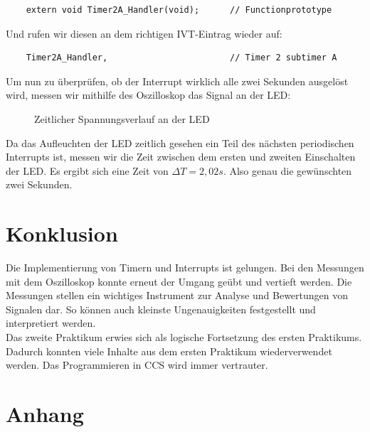 \documentclass{article}
\begin{document}
\begin{verbatim}
    extern void Timer2A_Handler(void);      // Functionprototype
\end{verbatim}

Und rufen wir diesen an dem richtigen IVT-Eintrag wieder auf: 

\begin{verbatim}
    Timer2A_Handler,                        // Timer 2 subtimer A
\end{verbatim}

\newpage

Um nun zu überprüfen, ob der Interrupt wirklich alle zwei Sekunden ausgelöst wird, messen wir mithilfe des Oszilloskop das Signal an der LED:

\begin{figure}[h]
    \centering
    \caption{Zeitlicher Spannungsverlauf an der LED}
\end{figure}

Da das Aufleuchten der LED zeitlich gesehen ein Teil des nächsten periodischen Interrupts ist, messen wir die Zeit zwischen dem ersten und zweiten Einschalten der LED. Es ergibt sich eine Zeit von $\Delta T = 2,02s$. Also genau die gewünschten zwei Sekunden.

\section{Konklusion}

Die Implementierung von Timern und Interrupts ist gelungen. Bei den Messungen mit dem Oszilloskop konnte erneut der Umgang geübt und vertieft werden. Die Messungen stellen ein wichtiges Instrument zur Analyse und Bewertungen von Signalen dar. So können auch kleinste Ungenauigkeiten festgestellt und interpretiert werden.\\
Das zweite Praktikum erwies sich als logische Fortsetzung des ersten Praktikums. Dadurch konnten viele Inhalte aus dem ersten Praktikum wiederverwendet werden. Das Programmieren in CCS wird immer vertrauter.

\newpage

\appendix

\section{Anhang}
\end{document}
